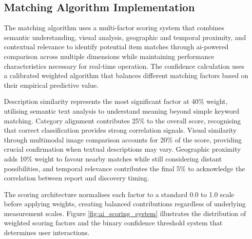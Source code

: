 \subsection{Matching Algorithm Implementation} \label{subsection:matching_algorithm}

The matching algorithm uses a multi-factor scoring system that combines semantic understanding, visual analysis, geographic and temporal proximity, and contextual relevance to identify potential item matches through \ac{ai}-powered comparison across multiple dimensions while maintaining performance characteristics necessary for real-time operation. The confidence calculation uses a calibrated weighted algorithm that balances different matching factors based on their empirical predictive value.

Description similarity represents the most significant factor at 40\% weight, utilising semantic text analysis to understand meaning beyond simple keyword matching. Category alignment contributes 25\% to the overall score, recognising that correct classification provides strong correlation signals. Visual similarity through multimodal image comparison accounts for 20\% of the score, providing crucial confirmation when textual descriptions may vary. Geographic proximity adds 10\% weight to favour nearby matches while still considering distant possibilities, and temporal relevance contributes the final 5\% to acknowledge the correlation between report and discovery timing.

The scoring architecture normalises each factor to a standard 0.0 to 1.0 scale before applying weights, creating balanced contributions regardless of underlying measurement scales. Figure \ref{fig:ai_scoring_system} illustrates the distribution of weighted scoring factors and the binary confidence threshold system that determines user interactions.

